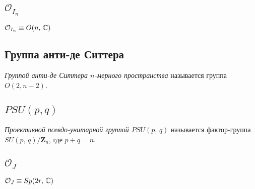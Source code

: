 \documentclass[a4paper,12pt]{article}
\begin{document}
\subsection{$\mathcal{O}_{I_n}$ }
$\mathcal{O}_{I_n} \equiv O(n,\,\mathbb{C})$
\subsection{Группа анти-де Ситтера}
\begin{dfn}
	\emph{Группой анти-де Ситтера $n$-мерного пространства} называется
	группа $O(2,n-2)$.
\end{dfn}
\subsection{$PSU(p, q)$ }
\begin{dfn}
	\emph{Проективной псевдо-унитарной группой $PSU(p,\,q)$} называется
	фактор-группа $SU(p,\,q) / \mathbf{Z}_n$, где  $p+q=n$.
\end{dfn}
\subsection{$\mathcal{O}_{J}$ }
$\mathcal{O}_{J} \equiv Sp(2r,\, \mathbb{C})$ 
\end{document}
